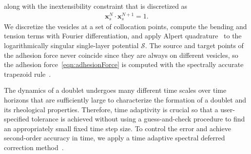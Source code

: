 \documentclass[prf,superscriptaddress,showpacs]{revtex4-1}
\renewcommand{\SS}{\mathcal{S}}
\newcommand{\xx}{\mathbf{x}}
\begin{document}
along with the inextensibility constraint that is discretized as
\begin{align*}
  \xx_s^{N} \cdot \xx_{s}^{N+1} = 1.
\end{align*}
We discretize the vesicles at a set of collocation points, compute the
bending and tension terms with Fourier differentiation, and apply Alpert
quadrature~\cite{alp1999} to the logarithmically singular single-layer
potential $\SS$.  The source and target points of the adhesion force
never coincide since they are always on different vesicles, so the
adhesion force~\eqref{eqn:adhesionForce} is computed with the spectrally
accurate trapezoid rule~\cite{tre-wei2014}.  

The dynamics of a doublet undergoes many different time scales over time
horizons that are sufficiently large to characterize the formation of a
doublet and its rheological properties.  Therefore, time adaptivity is
crucial so that a user-specified tolerance is achieved without using a
guess-and-check procedure to find an appropriately small fixed time step
size.  To control the error and achieve second-order accuracy in time,
we apply a time adaptive spectral deferred correction
method~\cite{quaife2016adaptive}. 

\end{document}
